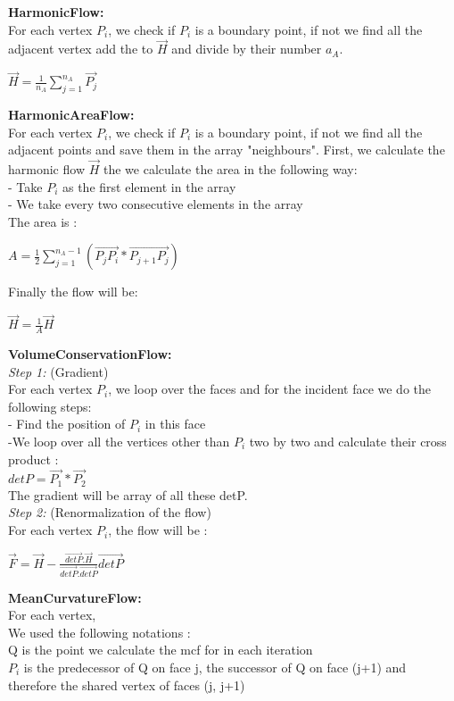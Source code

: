 \documentclass[12pt]{article}
\begin{document}
\textbf{HarmonicFlow:}
\\ For each vertex $P_i$, we check if $P_i$ is a boundary point, if not we find all the adjacent vertex add the to $\vec{H}$ and divide by their number $a_A$.
\\ \begin{center}
$\vec{H}=\frac{1}{n_A} \sum_{j=1}^{n_A} \vec{P_j}$
\end{center}
\textbf{HarmonicAreaFlow:}
\\ For each vertex $P_i$, we check if $P_i$ is a boundary point, if not we find all the adjacent points and save them in the array "neighbours". First, we calculate the harmonic flow $\vec{H}$ the we calculate the area in the following way:
\\ - Take $P_i$ as the first element in the array 
\\ - We take every two consecutive elements in the array 
\\ The area is :
\begin{center}
$A=\frac{1}{2} \sum_{j=1}^{n_A-1} (\vec{P_jP_i} * \vec{P_{j+1}P_j} )$
\end{center}
Finally the flow will be:
\begin{center}
$\vec{H}=\frac{1}{A} \vec{H}$
\end{center}
\textbf{VolumeConservationFlow:}
\\ \textit{Step 1:} (Gradient)
\\ For each vertex $P_i$, we loop over the faces and for the incident face we do the following steps:
\\- Find the position of $P_i$ in this face 
\\-We loop over all the vertices other than $P_i$ two by two and calculate their cross product :\\ $detP= \vec{P_1} * \vec{P_2} $
\\The gradient will be array of all these detP.
\\\textit{Step 2:} (Renormalization of the flow)
\\For each vertex $P_i$, the flow will be :
\begin{center}
$\vec{F}= \vec{H}- \frac{\vec{detP}. \vec{H}}{\vec{detP}. \vec{detP}}\vec{detP}$
\end{center}
\textbf{MeanCurvatureFlow:}
\\ For each vertex,
\\We used the following notations :
\\ Q is the point we calculate the mcf for in each iteration
\\$P_i$ is the predecessor of Q on face j, the successor of Q on face (j+1) and therefore the shared vertex of faces (j, j+1)
\end{document}

